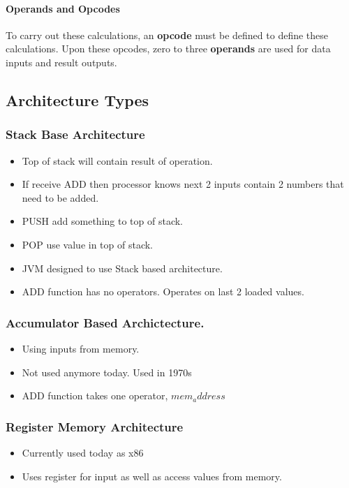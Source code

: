 \documentclass{article}
\newcommand\tab[1][0.5cm]{\hspace*{#1}}
\begin{document}
		\paragraph{\tab Operands and Opcodes} To carry out these calculations, an \textbf{opcode} must be defined to define these calculations. Upon these opcodes, zero to three \textbf{operands} are used for data inputs and result outputs.

	\subsection{Architecture Types}
		\subsubsection{Stack Base Architecture}
			\begin{itemize}
				\item Top of stack will contain result of operation.
				\item If receive ADD then processor knows next 2 inputs contain 2 numbers that need to be added.
				\item PUSH add something to top of stack.
				\item POP use value in top of stack.
				\item JVM designed to use Stack based architecture.
				\item ADD function has no operators. Operates on last 2 loaded values.
			\end{itemize}

		\subsubsection{Accumulator Based Archictecture.}
			\begin{itemize}
				\item Using inputs from memory.
				\item Not used anymore today. Used in 1970s
				\item ADD function takes one operator, $mem_address$
			\end{itemize}

		\subsubsection{Register Memory Architecture}
			\begin{itemize}
				\item Currently used today as x86
				\item Uses register for input as well as access values from memory.
			\end{itemize}
\end{document}
